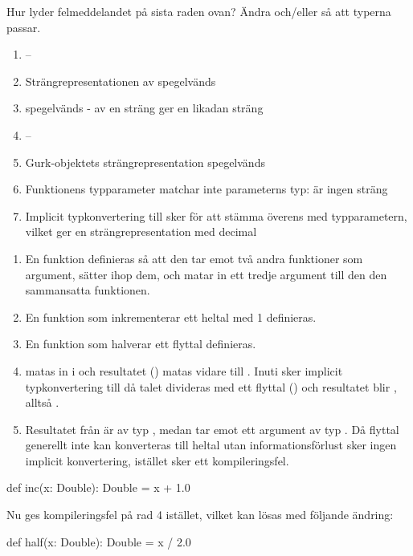 \Subtask Hur lyder felmeddelandet på sista raden ovan? Ändra  och/eller  så att typerna passar.

\SOLUTION

\TaskSolved \what

\SubtaskSolved   \begin{enumerate}
\item --
\item Strängrepresentationen av  spegelvänds
\item {} spegelvänds -  av en sträng ger en likadan sträng
\item --
\item Gurk-objektets strängrepresentation spegelvänds
\item Funktionens typparameter matchar inte parameterns typ:  är ingen sträng
\item Implicit typkonvertering till  sker för att stämma överens med typparametern, vilket ger en strängrepresentation med decimal
\end{enumerate}

\SubtaskSolved   \begin{enumerate}
\item En funktion definieras så att den tar emot två andra funktioner som argument, sätter ihop dem, och matar in ett tredje argument till den den sammansatta funktionen.
\item En funktion som inkrementerar ett heltal med 1 definieras.
\item En funktion som halverar ett flyttal definieras.
\item {} matas in i  och resultatet () matas vidare till . Inuti  sker implicit typkonvertering till  då talet divideras med ett flyttal () och resultatet blir , alltså .
\item Resultatet från  är av typ , medan  tar emot ett argument av typ . Då flyttal generellt inte kan konverteras till heltal utan informationsförlust sker ingen implicit konvertering, istället sker ett kompileringsfel.
\end{enumerate}

\SubtaskSolved  \begin{Code}
def inc(x: Double): Double = x + 1.0
\end{Code}
Nu ges kompileringsfel på rad 4 istället, vilket kan lösas med följande ändring:
\begin{Code}
def half(x: Double): Double = x / 2.0
\end{Code}

